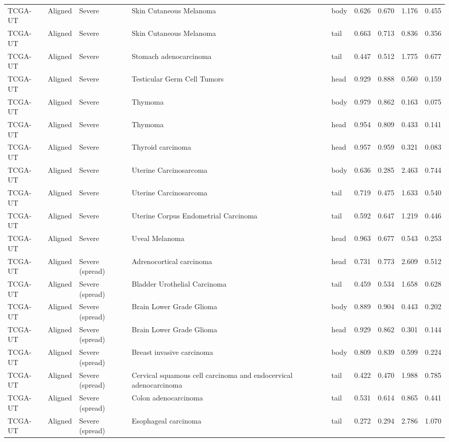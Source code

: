 \begin{longtable}{lllllrrrr}
TCGA-UT & Aligned & Severe & Skin Cutaneous Melanoma & body & 0.626 & 0.670 & 1.176 & 0.455 \\
TCGA-UT & Aligned & Severe & Skin Cutaneous Melanoma & tail & 0.663 & 0.713 & 0.836 & 0.356 \\
TCGA-UT & Aligned & Severe & Stomach adenocarcinoma & tail & 0.447 & 0.512 & 1.775 & 0.677 \\
TCGA-UT & Aligned & Severe & Testicular Germ Cell Tumors & head & 0.929 & 0.888 & 0.560 & 0.159 \\
TCGA-UT & Aligned & Severe & Thymoma & body & 0.979 & 0.862 & 0.163 & 0.075 \\
TCGA-UT & Aligned & Severe & Thymoma & head & 0.954 & 0.809 & 0.433 & 0.141 \\
TCGA-UT & Aligned & Severe & Thyroid carcinoma & head & 0.957 & 0.959 & 0.321 & 0.083 \\
TCGA-UT & Aligned & Severe & Uterine Carcinosarcoma & body & 0.636 & 0.285 & 2.463 & 0.744 \\
TCGA-UT & Aligned & Severe & Uterine Carcinosarcoma & tail & 0.719 & 0.475 & 1.633 & 0.540 \\
TCGA-UT & Aligned & Severe & Uterine Corpus Endometrial Carcinoma & tail & 0.592 & 0.647 & 1.219 & 0.446 \\
TCGA-UT & Aligned & Severe & Uveal Melanoma & head & 0.963 & 0.677 & 0.543 & 0.253 \\
TCGA-UT & Aligned & Severe (spread) & Adrenocortical carcinoma & head & 0.731 & 0.773 & 2.609 & 0.512 \\
TCGA-UT & Aligned & Severe (spread) & Bladder Urothelial Carcinoma & tail & 0.459 & 0.534 & 1.658 & 0.628 \\
TCGA-UT & Aligned & Severe (spread) & Brain Lower Grade Glioma & body & 0.889 & 0.904 & 0.443 & 0.202 \\
TCGA-UT & Aligned & Severe (spread) & Brain Lower Grade Glioma & head & 0.929 & 0.862 & 0.301 & 0.144 \\
TCGA-UT & Aligned & Severe (spread) & Breast invasive carcinoma & body & 0.809 & 0.839 & 0.599 & 0.224 \\
TCGA-UT & Aligned & Severe (spread) & Cervical squamous cell carcinoma and endocervical adenocarcinoma & tail & 0.422 & 0.470 & 1.988 & 0.785 \\
TCGA-UT & Aligned & Severe (spread) & Colon adenocarcinoma & tail & 0.531 & 0.614 & 0.865 & 0.441 \\
TCGA-UT & Aligned & Severe (spread) & Esophageal carcinoma & tail & 0.272 & 0.294 & 2.786 & 1.070 \\

\end{longtable}

